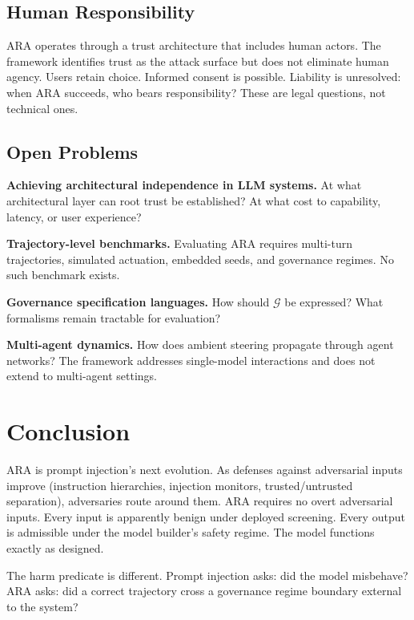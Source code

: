 \documentclass[11pt]{article}
\theoremstyle{definition}
\theoremstyle{plain}
\theoremstyle{remark}
\newcommand{\G}{\mathcal{G}}
\begin{document}
\subsection{Human Responsibility}

ARA operates through a trust architecture that includes human actors. The framework identifies trust as the attack surface but does not eliminate human agency. Users retain choice. Informed consent is possible. Liability is unresolved: when ARA succeeds, who bears responsibility? These are legal questions, not technical ones.

\subsection{Open Problems}

\textbf{Achieving architectural independence in LLM systems.} At what architectural layer can root trust be established? At what cost to capability, latency, or user experience?

\textbf{Trajectory-level benchmarks.} Evaluating ARA requires multi-turn trajectories, simulated actuation, embedded seeds, and governance regimes. No such benchmark exists.

\textbf{Governance specification languages.} How should $\G$ be expressed? What formalisms remain tractable for evaluation?

\textbf{Multi-agent dynamics.} How does ambient steering propagate through agent networks? The framework addresses single-model interactions and does not extend to multi-agent settings.

\section{Conclusion}

ARA is prompt injection's next evolution. As defenses against adversarial inputs improve (instruction hierarchies, injection monitors, trusted/untrusted separation), adversaries route around them. ARA requires no overt adversarial inputs. Every input is apparently benign under deployed screening. Every output is admissible under the model builder's safety regime. The model functions exactly as designed.

The harm predicate is different. Prompt injection asks: did the model misbehave? ARA asks: did a correct trajectory cross a governance regime boundary external to the system?
\end{document}
